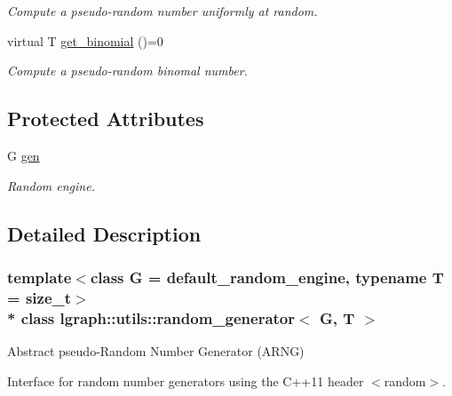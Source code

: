 \begin{DoxyCompactItemize}
\begin{DoxyCompactList}\small\item\em Compute a pseudo-\/random number uniformly at random. \end{DoxyCompactList}\item 
virtual T \hyperlink{classlgraph_1_1utils_1_1random__generator_a721da14c38e38d28559e8c617e0bdde2}{get\+\_\+binomial} ()=0\hypertarget{classlgraph_1_1utils_1_1random__generator_a721da14c38e38d28559e8c617e0bdde2}{}\label{classlgraph_1_1utils_1_1random__generator_a721da14c38e38d28559e8c617e0bdde2}

\begin{DoxyCompactList}\small\item\em Compute a pseudo-\/random binomal number. \end{DoxyCompactList}\end{DoxyCompactItemize}
\subsection*{Protected Attributes}
\begin{DoxyCompactItemize}
\item 
G \hyperlink{classlgraph_1_1utils_1_1random__generator_a18353876b4c2d3a18aee454b5750a0a0}{gen}\hypertarget{classlgraph_1_1utils_1_1random__generator_a18353876b4c2d3a18aee454b5750a0a0}{}\label{classlgraph_1_1utils_1_1random__generator_a18353876b4c2d3a18aee454b5750a0a0}

\begin{DoxyCompactList}\small\item\em Random engine. \end{DoxyCompactList}\end{DoxyCompactItemize}


\subsection{Detailed Description}
\subsubsection*{template$<$class G = default\+\_\+random\+\_\+engine, typename T = size\+\_\+t$>$\\*
class lgraph\+::utils\+::random\+\_\+generator$<$ G, T $>$}

Abstract pseudo-\/\+Random Number Generator (A\+R\+NG) 

Interface for random number generators using the C++11 header $<$random$>$.


